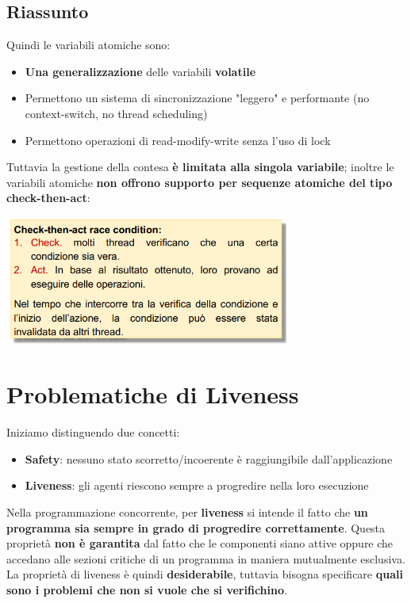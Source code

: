 \documentclass[12pt]{article}
\begin{document}
\subsection{Riassunto}
Quindi le variabili atomiche sono:
\begin{itemize}
    \item \textbf{Una generalizzazione} delle variabili \textbf{volatile}
    \item Permettono un sistema di sincronizzazione "leggero" e performante (no context-switch, no thread scheduling)
    \item Permettono operazioni di read-modify-write senza l'uso di lock
\end{itemize}
Tuttavia la gestione della contesa \textbf{è limitata alla singola variabile}; inoltre le variabili atomiche \textbf{non offrono supporto per sequenze atomiche del tipo check-then-act}:
\begin{center}
    \includegraphics[width = 0.70\textwidth]{Images/103.PNG}
\end{center}
\section{Problematiche di Liveness}
Iniziamo distinguendo due concetti:
\begin{itemize}
    \item \textbf{Safety}: nessuno stato scorretto/incoerente è raggiungibile dall'applicazione
    \item \textbf{Liveness}: gli agenti riescono sempre a progredire nella loro esecuzione
\end{itemize}
Nella programmazione concorrente, per \textbf{liveness} si intende il fatto che \textbf{un programma sia sempre in grado di progredire correttamente}. Questa proprietà \textbf{non è garantita} dal fatto che le componenti siano attive oppure che accedano alle sezioni critiche di un programma in maniera mutualmente esclusiva. La proprietà di liveness è quindi \textbf{desiderabile}, tuttavia bisogna specificare \textbf{quali sono i problemi che non si vuole che si verifichino}.
\end{document}
